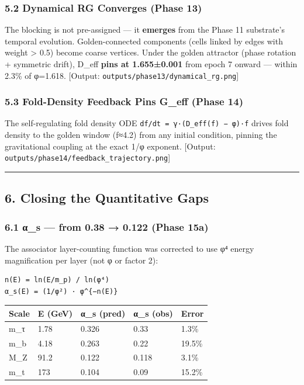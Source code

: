 \documentclass[
]{article}
\begin{document}
\subsubsection{5.2 Dynamical RG Converges (Phase
13)}\label{dynamical-rg-converges-phase-13}

The blocking is not pre-assigned --- it \textbf{emerges} from the Phase
11 substrate's temporal evolution. Golden-connected components (cells
linked by edges with weight \textgreater{} 0.5) become coarse vertices.
Under the golden attractor (phase rotation + symmetric drift), D\_eff
\textbf{pins at 1.655±0.001} from epoch 7 onward --- within 2.3\% of
φ=1.618. {[}Output: \texttt{outputs/phase13/dynamical\_rg.png}{]}

\subsubsection{5.3 Fold-Density Feedback Pins G\_eff (Phase
14)}\label{fold-density-feedback-pins-g_eff-phase-14}

The self-regulating fold density ODE
\texttt{df/dt\ =\ γ·(D\_eff(f)\ −\ φ)·f} drives fold density to the
golden window (f≈4.2) from any initial condition, pinning the
gravitational coupling at the exact 1/φ exponent. {[}Output:
\texttt{outputs/phase14/feedback\_trajectory.png}{]}

\begin{center}\rule{0.5\linewidth}{0.5pt}\end{center}

\subsection{6. Closing the Quantitative
Gaps}\label{closing-the-quantitative-gaps}

\subsubsection{6.1 α\_s --- from 0.38 → 0.122 (Phase
15a)}\label{ux3b1_s-from-0.38-0.122-phase-15a}

The associator layer-counting function was corrected to use φ⁴ energy
magnification per layer (not φ or factor 2):

\begin{verbatim}
n(E) = ln(E/m_p) / ln(φ⁴)
α_s(E) = (1/φ²) · φ^{−n(E)}
\end{verbatim}

\begin{longtable}[]{@{}lllll@{}}
\toprule\noalign{}
Scale & E (GeV) & α\_s (pred) & α\_s (obs) & Error \\
\midrule\noalign{}
\endhead
\bottomrule\noalign{}
\endlastfoot
m\_τ & 1.78 & 0.326 & 0.33 & 1.3\% \\
m\_b & 4.18 & 0.263 & 0.22 & 19.5\% \\
M\_Z & 91.2 & 0.122 & 0.118 & 3.1\% \\
m\_t & 173 & 0.104 & 0.09 & 15.2\% \\
\end{longtable}
\end{document}
